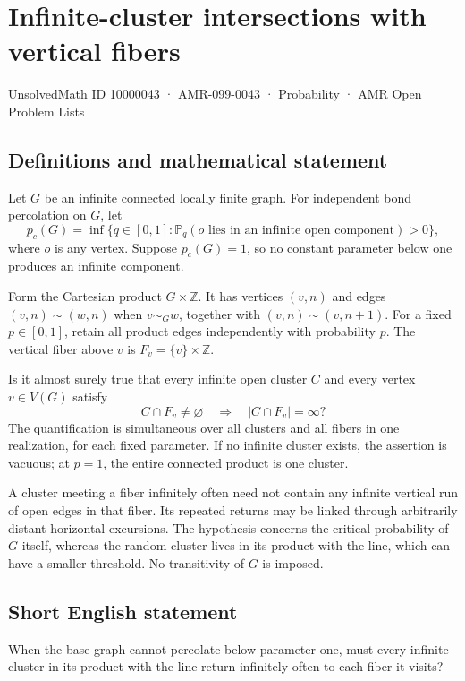 \documentclass[11pt,a4paper]{article}
\begin{document}
\section*{Infinite-cluster intersections with vertical fibers}\label{10000043}
{\small UnsolvedMath ID 10000043 · AMR-099-0043 · Probability · AMR Open Problem Lists}
\subsection{Definitions and mathematical statement}
Let $G$ be an infinite connected locally finite graph. For independent bond percolation on $G$, let
\[
p_c(G)=\inf\{q\in[0,1]:\mathbb P_q(o\text{ lies in an infinite open component})>0\},
\]
where $o$ is any vertex. Suppose $p_c(G)=1$, so no constant parameter below one produces an infinite component.

Form the Cartesian product $G\times\mathbb Z$. It has vertices $(v,n)$ and edges $(v,n)\sim(w,n)$ when $v\sim_Gw$, together with $(v,n)\sim(v,n+1)$. For a fixed $p\in[0,1]$, retain all product edges independently with probability $p$. The vertical fiber above $v$ is $F_v=\{v\}\times\mathbb Z$.

Is it almost surely true that every infinite open cluster $C$ and every vertex $v\in V(G)$ satisfy
\[
C\cap F_v\ne\varnothing\quad\Longrightarrow\quad |C\cap F_v|=\infty?
\]
The quantification is simultaneous over all clusters and all fibers in one realization, for each fixed parameter. If no infinite cluster exists, the assertion is vacuous; at $p=1$, the entire connected product is one cluster.

A cluster meeting a fiber infinitely often need not contain any infinite vertical run of open edges in that fiber. Its repeated returns may be linked through arbitrarily distant horizontal excursions. The hypothesis concerns the critical probability of $G$ itself, whereas the random cluster lives in its product with the line, which can have a smaller threshold. No transitivity of $G$ is imposed.
\subsection{Short English statement}
When the base graph cannot percolate below parameter one, must every infinite cluster in its product with the line return infinitely often to each fiber it visits?
\end{document}
